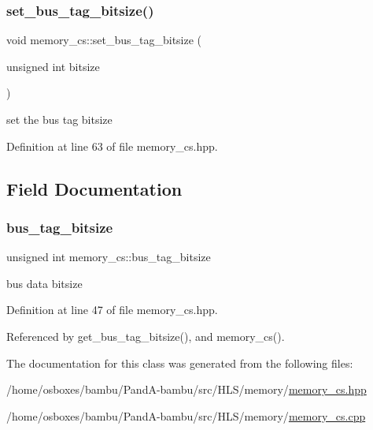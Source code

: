 \mbox{\label{classmemory__cs_a17c82e4db2eb296e34f91cf53132c116}} 
\subsubsection{\texorpdfstring{set\+\_\+bus\+\_\+tag\+\_\+bitsize()}{set\_bus\_tag\_bitsize()}}
{\footnotesize\ttfamily void memory\+\_\+cs\+::set\+\_\+bus\+\_\+tag\+\_\+bitsize (\begin{DoxyParamCaption}\item[{unsigned int}]{bitsize }\end{DoxyParamCaption})\hspace{0.3cm}{\ttfamily [inline]}}



set the bus tag bitsize 



Definition at line 63 of file memory\+\_\+cs.\+hpp.



\subsection{Field Documentation}
\mbox{\label{classmemory__cs_a675f8fd3c82e00d105ceb0b38e121819}} 
\subsubsection{\texorpdfstring{bus\+\_\+tag\+\_\+bitsize}{bus\_tag\_bitsize}}
{\footnotesize\ttfamily unsigned int memory\+\_\+cs\+::bus\+\_\+tag\+\_\+bitsize\hspace{0.3cm}{\ttfamily [private]}}



bus data bitsize 



Definition at line 47 of file memory\+\_\+cs.\+hpp.



Referenced by get\+\_\+bus\+\_\+tag\+\_\+bitsize(), and memory\+\_\+cs().



The documentation for this class was generated from the following files\+:\begin{DoxyCompactItemize}
\item 
/home/osboxes/bambu/\+Pand\+A-\/bambu/src/\+H\+L\+S/memory/\hyperlink{memory__cs_8hpp}{memory\+\_\+cs.\+hpp}\item 
/home/osboxes/bambu/\+Pand\+A-\/bambu/src/\+H\+L\+S/memory/\hyperlink{memory__cs_8cpp}{memory\+\_\+cs.\+cpp}\end{DoxyCompactItemize}
